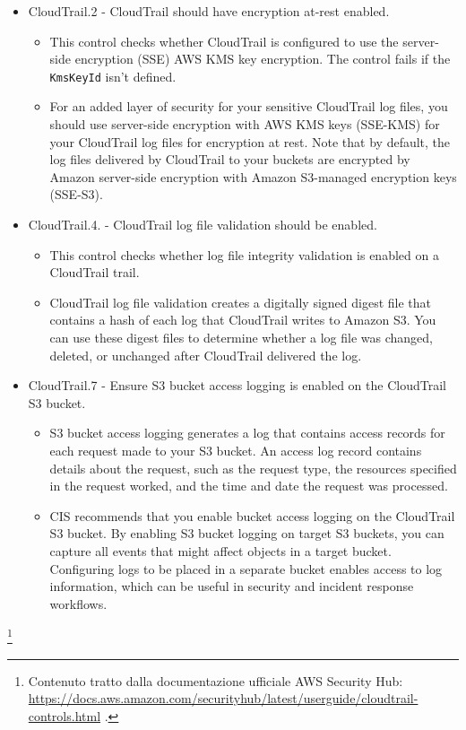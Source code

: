 \begin{mdframed}[backgroundcolor=gray!05, linecolor=gray!50]
\begin{itemize}
\begin{itemize}
\begin{itemize}
        \end{itemize}
    \end{itemize}
    \item CloudTrail.2 - CloudTrail should have encryption at-rest enabled.
    \begin{itemize}
        \item This control checks whether CloudTrail is configured to use the server-side encryption (SSE) AWS KMS key encryption. The control fails if the \texttt{KmsKeyId} isn't defined.
        \item For an added layer of security for your sensitive CloudTrail log files, you should use server-side encryption with AWS KMS keys (SSE-KMS) for your CloudTrail log files for encryption at rest. Note that by default, the log files delivered by CloudTrail to your buckets are encrypted by Amazon server-side encryption with Amazon S3-managed encryption keys (SSE-S3).
    \end{itemize}
    \item CloudTrail.4. - CloudTrail log file validation should be enabled.
    \begin{itemize}
        \item This control checks whether log file integrity validation is enabled on a CloudTrail trail.
        \item CloudTrail log file validation creates a digitally signed digest file that contains a hash of each log that CloudTrail writes to Amazon S3. You can use these digest files to determine whether a log file was changed, deleted, or unchanged after CloudTrail delivered the log.
    \end{itemize}
    \item CloudTrail.7 - Ensure S3 bucket access logging is enabled on the CloudTrail S3 bucket.
    \begin{itemize}
        \item S3 bucket access logging generates a log that contains access records for each request made to your S3 bucket. An access log record contains details about the request, such as the request type, the resources specified in the request worked, and the time and date the request was processed.
        \item CIS recommends that you enable bucket access logging on the CloudTrail S3 bucket. By enabling S3 bucket logging on target S3 buckets, you can capture all events that might affect objects in a target bucket. Configuring logs to be placed in a separate bucket enables access to log information, which can be useful in security and incident response workflows.
    \end{itemize}
\end{itemize}
\end{mdframed}
\footnote{Contenuto tratto dalla documentazione ufficiale AWS Security Hub: \url{https://docs.aws.amazon.com/securityhub/latest/userguide/cloudtrail-controls.html} .}

